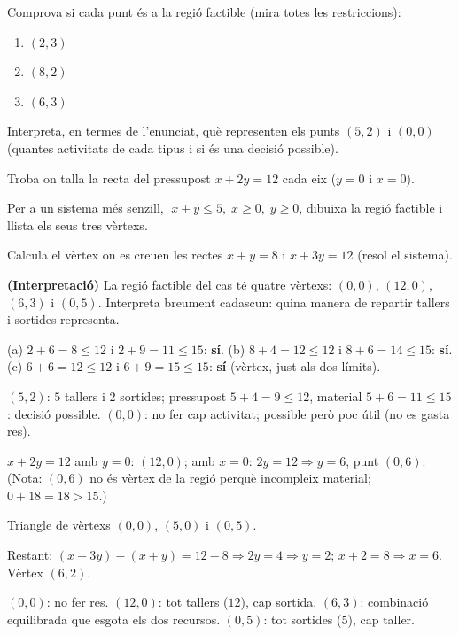 \begin{exercicis}
\begin{exlist}
  \item Comprova si cada punt és a la regió factible (mira totes les restriccions):
        \begin{enumerate}[label=\alph*), leftmargin=1.6em, topsep=2pt]
          \item $(2,3)$ \hfill \item $(8,2)$ \hfill \item $(6,3)$
        \end{enumerate}
  \item Interpreta, en termes de l'enunciat, què representen els punts $(5,2)$ i
        $(0,0)$ (quantes activitats de cada tipus i si és una decisió possible).
  \item Troba on talla la recta del pressupost $x+2y=12$ cada eix ($y=0$ i $x=0$).
  \item Per a un sistema més senzill, $\;x+y\le 5,\;x\ge 0,\;y\ge 0$, dibuixa la regió
        factible i llista els seus tres vèrtexs.
  \item Calcula el vèrtex on es creuen les rectes $x+y=8$ i $x+3y=12$ (resol el sistema).
  \item \textbf{(Interpretació)} La regió factible del cas té quatre vèrtexs:
        $(0,0)$, $(12,0)$, $(6,3)$ i $(0,5)$. Interpreta breument cadascun: quina
        manera de repartir tallers i sortides representa.
\end{exlist}
\end{exercicis}

\begin{solucions}
\begin{sollist}
  \item (a) $2+6=8\le 12$ i $2+9=11\le 15$: \textbf{sí}. \quad
        (b) $8+4=12\le 12$ i $8+6=14\le 15$: \textbf{sí}. \quad
        (c) $6+6=12\le 12$ i $6+9=15\le 15$: \textbf{sí} (vèrtex, just als dos límits).
  \item $(5,2)$: $5$ tallers i $2$ sortides; pressupost $5+4=9\le 12$, material
        $5+6=11\le 15$: decisió possible. $(0,0)$: no fer cap activitat; possible però
        poc útil (no es gasta res).
  \item $x+2y=12$ amb $y=0$: $(12,0)$; amb $x=0$: $2y=12\Rightarrow y=6$, punt $(0,6)$.
        (Nota: $(0,6)$ no és vèrtex de la regió perquè incompleix material;
        $0+18=18>15$.)
  \item Triangle de vèrtexs $(0,0)$, $(5,0)$ i $(0,5)$.
  \item Restant: $(x+3y)-(x+y)=12-8\Rightarrow 2y=4\Rightarrow y=2$; $x+2=8\Rightarrow
        x=6$. Vèrtex $(6,2)$.
  \item $(0,0)$: no fer res. $(12,0)$: tot tallers ($12$), cap sortida. $(6,3)$:
        combinació equilibrada que esgota els dos recursos. $(0,5)$: tot sortides
        ($5$), cap taller.
\end{sollist}
\end{solucions}
